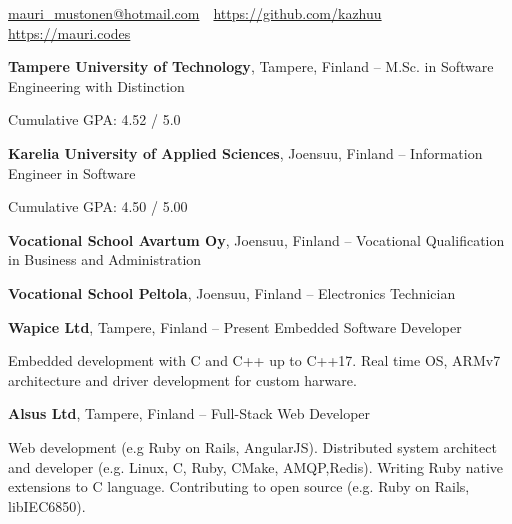 \documentclass[letterpaper,MMMyyyy,nonstopmode]{simpleresumecv}
\newcommand{\CVAuthor}{Mauri Mustonen}
\newcommand{\CVWebpage}{https://mauri.codes}
\begin{document}

\Title{\CVAuthor}

\begin{SubTitle}
    \par
    \href{mailto:mauri\_mustonen@hotmail.com}{mauri\_mustonen@hotmail.com}\,
    \SubBulletSymbol\,
    \href{https://github.com/kazhuu}{https://github.com/kazhuu}\,
    \SubBulletSymbol\,
    \href{\CVWebpage}{\url{\CVWebpage}}
\end{SubTitle}

\begin{Body}



\Entry
\textbf{Tampere University of Technology}, Tampere, Finland
\hfill
{} -- 
\Gap
\BulletItem
M.Sc. in Software Engineering with Distinction
\begin{Detail}
    \SubBulletItem Cumulative GPA: 4.52 / 5.0
\end{Detail}

\BigGap
\Entry
\textbf{Karelia University of Applied Sciences}, Joensuu, Finland
\hfill
{} -- 
\Gap
\BulletItem
Information Engineer in Software
\begin{Detail}
    \SubBulletItem Cumulative GPA: 4.50 / 5.00
\end{Detail}

\BigGap
\Entry
\textbf{Vocational School Avartum Oy}, Joensuu, Finland
\hfill
{} -- 
\Gap
\BulletItem
Vocational Qualification in Business and Administration

\BigGap
\Entry
\textbf{Vocational School Peltola}, Joensuu, Finland
\hfill
{} -- 
\Gap
\BulletItem
Electronics Technician



\Entry
\textbf{Wapice Ltd}, Tampere, Finland
\hfill
{} -- Present
\Gap
\BulletItem Embedded Software Developer
\begin{Detail}
    \SubBulletItem Embedded development with C and C++ up to C++17.
    \SubBulletItem Real time OS, ARMv7 architecture and driver development for
    custom harware.
\end{Detail}

\BigGap
\Entry
\textbf{Alsus Ltd}, Tampere, Finland
\hfill
{} -- 
\Gap
\BulletItem Full-Stack Web Developer
\begin{Detail}
    \SubBulletItem Web development (e.g Ruby on Rails, AngularJS).
    \SubBulletItem Distributed system architect and developer (e.g. Linux, C, Ruby,
    CMake, AMQP,\newline  Redis).
    \SubBulletItem Writing Ruby native extensions to C language.
    \SubBulletItem Contributing to open source (e.g. Ruby on Rails, libIEC6850).
\end{Detail}


\end{Body}
\end{document}
